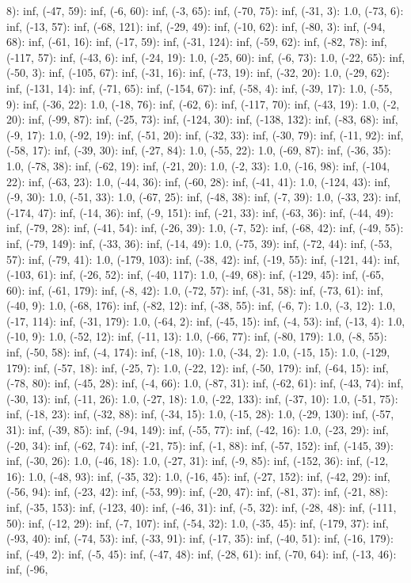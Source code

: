 \documentclass[parskip=half]{scrartcl}
\begin{document}
8): inf, (-47, 59): inf, (-6, 60): inf, (-3, 65): inf, (-70, 75): inf, (-31, 3): 1.0, (-73, 6): inf, (-13, 57): inf, (-68, 121): inf, (-29, 49): inf, (-10, 62): inf, (-80, 3): inf, (-94, 68): inf, (-61, 16): inf, (-17, 59): inf, (-31, 124): inf, (-59, 62): inf, (-82, 78): inf, (-117, 57): inf, (-43, 6): inf, (-24, 19): 1.0, (-25, 60): inf, (-6, 73): 1.0, (-22, 65): inf, (-50, 3): inf, (-105, 67): inf, (-31, 16): inf, (-73, 19): inf, (-32, 20): 1.0, (-29, 62): inf, (-131, 14): inf, (-71, 65): inf, (-154, 67): inf, (-58, 4): inf, (-39, 17): 1.0, (-55, 9): inf, (-36, 22): 1.0, (-18, 76): inf, (-62, 6): inf, (-117, 70): inf, (-43, 19): 1.0, (-2, 20): inf, (-99, 87): inf, (-25, 73): inf, (-124, 30): inf, (-138, 132): inf, (-83, 68): inf, (-9, 17): 1.0, (-92, 19): inf, (-51, 20): inf, (-32, 33): inf, (-30, 79): inf, (-11, 92): inf, (-58, 17): inf, (-39, 30): inf, (-27, 84): 1.0, (-55, 22): 1.0, (-69, 87): inf, (-36, 35): 1.0, (-78, 38): inf, (-62, 19): inf, (-21, 20): 1.0, (-2, 33): 1.0, (-16, 98): inf, (-104, 22): inf, (-63, 23): 1.0, (-44, 36): inf, (-60, 28): inf, (-41, 41): 1.0, (-124, 43): inf, (-9, 30): 1.0, (-51, 33): 1.0, (-67, 25): inf, (-48, 38): inf, (-7, 39): 1.0, (-33, 23): inf, (-174, 47): inf, (-14, 36): inf, (-9, 151): inf, (-21, 33): inf, (-63, 36): inf, (-44, 49): inf, (-79, 28): inf, (-41, 54): inf, (-26, 39): 1.0, (-7, 52): inf, (-68, 42): inf, (-49, 55): inf, (-79, 149): inf, (-33, 36): inf, (-14, 49): 1.0, (-75, 39): inf, (-72, 44): inf, (-53, 57): inf, (-79, 41): 1.0, (-179, 103): inf, (-38, 42): inf, (-19, 55): inf, (-121, 44): inf, (-103, 61): inf, (-26, 52): inf, (-40, 117): 1.0, (-49, 68): inf, (-129, 45): inf, (-65, 60): inf, (-61, 179): inf, (-8, 42): 1.0, (-72, 57): inf, (-31, 58): inf, (-73, 61): inf, (-40, 9): 1.0, (-68, 176): inf, (-82, 12): inf, (-38, 55): inf, (-6, 7): 1.0, (-3, 12): 1.0, (-17, 114): inf, (-31, 179): 1.0, (-64, 2): inf, (-45, 15): inf, (-4, 53): inf, (-13, 4): 1.0, (-10, 9): 1.0, (-52, 12): inf, (-11, 13): 1.0, (-66, 77): inf, (-80, 179): 1.0, (-8, 55): inf, (-50, 58): inf, (-4, 174): inf, (-18, 10): 1.0, (-34, 2): 1.0, (-15, 15): 1.0, (-129, 179): inf, (-57, 18): inf, (-25, 7): 1.0, (-22, 12): inf, (-50, 179): inf, (-64, 15): inf, (-78, 80): inf, (-45, 28): inf, (-4, 66): 1.0, (-87, 31): inf, (-62, 61): inf, (-43, 74): inf, (-30, 13): inf, (-11, 26): 1.0, (-27, 18): 1.0, (-22, 133): inf, (-37, 10): 1.0, (-51, 75): inf, (-18, 23): inf, (-32, 88): inf, (-34, 15): 1.0, (-15, 28): 1.0, (-29, 130): inf, (-57, 31): inf, (-39, 85): inf, (-94, 149): inf, (-55, 77): inf, (-42, 16): 1.0, (-23, 29): inf, (-20, 34): inf, (-62, 74): inf, (-21, 75): inf, (-1, 88): inf, (-57, 152): inf, (-145, 39): inf, (-30, 26): 1.0, (-46, 18): 1.0, (-27, 31): inf, (-9, 85): inf, (-152, 36): inf, (-12, 16): 1.0, (-48, 93): inf, (-35, 32): 1.0, (-16, 45): inf, (-27, 152): inf, (-42, 29): inf, (-56, 94): inf, (-23, 42): inf, (-53, 99): inf, (-20, 47): inf, (-81, 37): inf, (-21, 88): inf, (-35, 153): inf, (-123, 40): inf, (-46, 31): inf, (-5, 32): inf, (-28, 48): inf, (-111, 50): inf, (-12, 29): inf, (-7, 107): inf, (-54, 32): 1.0, (-35, 45): inf, (-179, 37): inf, (-93, 40): inf, (-74, 53): inf, (-33, 91): inf, (-17, 35): inf, (-40, 51): inf, (-16, 179): inf, (-49, 2): inf, (-5, 45): inf, (-47, 48): inf, (-28, 61): inf, (-70, 64): inf, (-13, 46): inf, (-96, 
\end{document}
